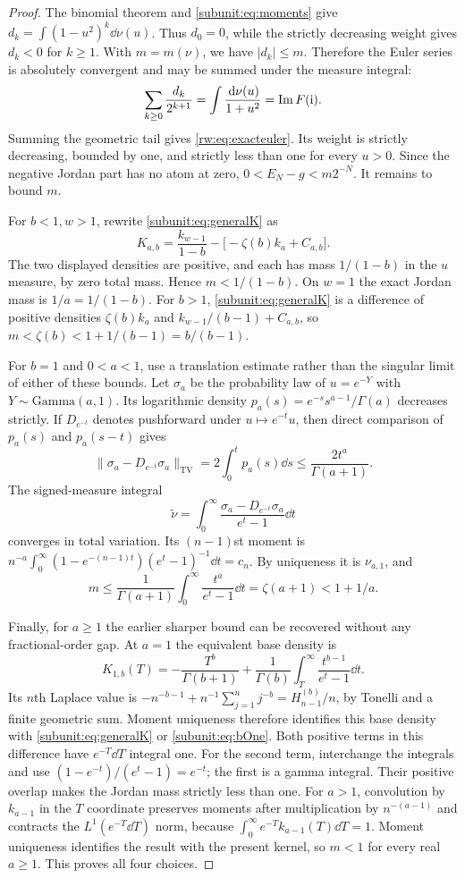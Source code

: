 \begin{proof}
The binomial theorem and \eqref{subunit:eq:moments} give
$d_k=\int(1-u^2)^k\dd\nu(u)$. Thus $d_0=0$, while the strictly
decreasing weight gives $d_k<0$ for $k\ge1$. With
$m=m(\nu)$, we have $|d_k|\le m$. Therefore the Euler series is
absolutely convergent and may be summed under the measure integral:
\[
 \sum_{k\ge0}\frac{d_k}{2^{k+1}}
 =\int\frac{\,\mathrm d\nu(u)}{1+u^2}=\operatorname{Im} F(\mathrm{i}).
\]
Summing the geometric tail gives \eqref{rw:eq:exacteuler}. Its weight
is strictly decreasing, bounded by one, and strictly less than one
for every $u>0$. Since the negative Jordan part has no atom at zero,
$0<E_N-g<m2^{-N}$. It remains to bound $m$.

For $b<1,w>1$, rewrite \eqref{subunit:eq:generalK} as
\[
 K_{a,b}=\frac{k_{w-1}}{1-b}
          -\bigl[-\zeta(b)k_a+C_{a,b}\bigr].
\]
The two displayed densities are positive, and each has mass
$1/(1-b)$ in the $u$ measure, by zero total mass. Hence
$m<1/(1-b)$. On $w=1$ the exact Jordan mass is $1/a=1/(1-b)$.
For $b>1$, \eqref{subunit:eq:generalK} is a difference of positive densities
$\zeta(b)k_a$ and $k_{w-1}/(b-1)+C_{a,b}$, so
$m<\zeta(b)<1+1/(b-1)=b/(b-1)$.

For $b=1$ and $0<a<1$, use a translation estimate rather than the
singular limit of either of these bounds. Let $\sigma_a$ be the
probability law of $u=e^{-Y}$ with $Y\sim\mathrm{Gamma}(a,1)$.
Its logarithmic density $p_a(s)=e^{-s}s^{a-1}/\Gamma(a)$ decreases
strictly. If $D_{e^{-t}}$ denotes pushforward under $u\mapsto e^{-t}u$,
then direct comparison of $p_a(s)$ and $p_a(s-t)$ gives
\[
 \|\sigma_a-D_{e^{-t}}\sigma_a\|_{\mathrm{TV}}
 =2\int_0^tp_a(s)\dd s
 \le\frac{2t^a}{\Gamma(a+1)}.
\]
The signed-measure integral
\[
 \widetilde\nu=\int_0^\infty
       \frac{\sigma_a-D_{e^{-t}}\sigma_a}{e^t-1}\dd t
\]
converges in total variation. Its $(n-1)$st moment is
$n^{-a}\int_0^\infty(1-e^{-(n-1)t})(e^t-1)^{-1}\dd t=c_n$.
By uniqueness it is $\nu_{a,1}$, and
\[
 m\le\frac1{\Gamma(a+1)}\int_0^\infty\frac{t^a}{e^t-1}\dd t
 =\zeta(a+1)<1+1/a.
\]

Finally, for $a\ge1$ the earlier sharper bound can be recovered
without any fractional-order gap. At $a=1$ the equivalent base density is
\[
 K_{1,b}(T)=-\frac{T^b}{\Gamma(b+1)}
 +\frac1{\Gamma(b)}\int_T^\infty\frac{t^{b-1}}{e^t-1}\dd t.
\]
Its $n$th Laplace value is
$-n^{-b-1}+n^{-1}\sum_{j=1}^n j^{-b}=H_{n-1}^{(b)}/n$,
by Tonelli and a finite geometric sum. Moment uniqueness therefore
identifies this base density with \eqref{subunit:eq:generalK} or \eqref{subunit:eq:bOne}.
Both positive terms in this difference have $e^{-T}\dd T$ integral
one. For the second term, interchange the integrals and use
$(1-e^{-t})/(e^t-1)=e^{-t}$; the first is a gamma integral.
Their positive overlap makes the Jordan mass strictly less than one.
For $a>1$, convolution by $k_{a-1}$ in the $T$ coordinate preserves
moments after multiplication by $n^{-(a-1)}$ and contracts the
$L^1(e^{-T}\dd T)$ norm, because
$\int_0^\infty e^{-T}k_{a-1}(T)\dd T=1$.
Moment uniqueness identifies the result with the present kernel,
so $m<1$ for every real $a\ge1$. This proves all four choices.
\end{proof}


